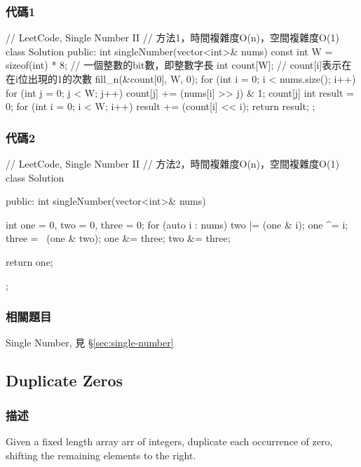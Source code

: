 \subsubsection{代碼1}
\begin{Code}
// LeetCode, Single Number II
// 方法1，時間複雜度O(n)，空間複雜度O(1)
class Solution {
public:
    int singleNumber(vector<int>& nums) {
        const int W = sizeof(int) * 8; // 一個整數的bit數，即整數字長
        int count[W];  // count[i]表示在在i位出現的1的次數
        fill_n(&count[0], W, 0);
        for (int i = 0; i < nums.size(); i++) {
            for (int j = 0; j < W; j++) {
                count[j] += (nums[i] >> j) & 1;
                count[j] %
            }
        }
        int result = 0;
        for (int i = 0; i < W; i++) {
            result += (count[i] << i);
        }
        return result;
    }
};
\end{Code}


\subsubsection{代碼2}
\begin{Code}
// LeetCode, Single Number II
// 方法2，時間複雜度O(n)，空間複雜度O(1)
class Solution {
public:
    int singleNumber(vector<int>& nums) {
        int one = 0, two = 0, three = 0;
        for (auto i : nums) {
            two |= (one & i);
            one ^= i;
            three = ~(one & two);
            one &= three;
            two &= three;
        }

        return one;
    }
};
\end{Code}


\subsubsection{相關題目}
\begindot
\item  Single Number, 見 \S \ref{sec:single-number}
\myenddot

\subsection{Duplicate Zeros}
\label{sec:duplicate-zeros}


\subsubsection{描述}
Given a fixed length array arr of integers, duplicate each occurrence of zero, shifting the remaining elements to the right.

